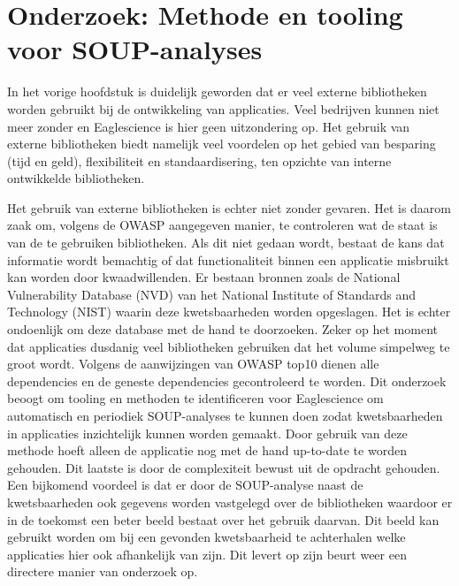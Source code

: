 \chapter{Onderzoek: Methode en tooling voor SOUP-analyses}\label{ch:onderzoek-tool-methode}
In het vorige hoofdstuk is duidelijk geworden dat er veel externe bibliotheken worden gebruikt bij de ontwikkeling van applicaties. Veel bedrijven kunnen niet meer zonder en Eaglescience is hier geen uitzondering op. Het gebruik van externe bibliotheken biedt namelijk veel voordelen op het gebied van besparing (tijd en geld), flexibiliteit en standaardisering, ten opzichte van interne ontwikkelde bibliotheken.

Het gebruik van externe bibliotheken is echter niet zonder gevaren. Het is daarom zaak om, volgens de OWASP aangegeven manier, te controleren wat de staat is van de te gebruiken bibliotheken. Als dit niet gedaan wordt, bestaat de kans dat informatie wordt bemachtig of dat functionaliteit binnen een applicatie misbruikt kan worden door kwaadwillenden. Er bestaan bronnen zoals de National Vulnerability Database (NVD) van het National Institute of Standards and Technology (NIST) waarin deze kwetsbaarheden worden opgeslagen. Het is echter ondoenlijk om deze database met de hand te doorzoeken. Zeker op het moment dat applicaties dusdanig veel bibliotheken gebruiken dat het volume simpelweg te groot wordt. Volgens de aanwijzingen van OWASP top10 dienen alle dependencies en de geneste dependencies gecontroleerd te worden.
Dit onderzoek beoogt om tooling en methoden te identificeren voor Eaglescience om automatisch en periodiek SOUP-analyses te kunnen doen zodat kwetsbaarheden in applicaties inzichtelijk kunnen worden gemaakt. Door gebruik van deze methode hoeft alleen de applicatie nog met de hand up-to-date te worden gehouden. Dit laatste is door de complexiteit bewust uit de opdracht gehouden. Een bijkomend voordeel is dat er door de SOUP-analyse naast de kwetsbaarheden ook gegevens worden vastgelegd over de bibliotheken waardoor er in de toekomst een beter beeld bestaat over het gebruik daarvan. Dit beeld kan gebruikt worden om bij een gevonden kwetsbaarheid te achterhalen welke applicaties hier ook afhankelijk van zijn. Dit levert op zijn beurt weer een directere manier van onderzoek op.

